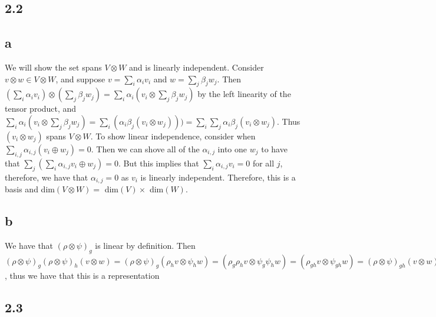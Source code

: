 \documentclass[]{article}
\begin{document}
\subsection*{2.2}
\subsection*{a}
We will show the set spans $V \otimes W$ and is linearly independent.
Consider $v \otimes w \in V \otimes W$, and suppose $v = \sum_i \alpha_i v_i$ and $w = \sum_j \beta_j w_j$. Then $ (\sum_i \alpha_i v_i) \otimes (\sum_j \beta_j w_j) = \sum_i \alpha_i (v_i \otimes \sum_j \beta_j w_j)$ by the left linearity of the tensor product, and $\sum_i \alpha_i (v_i \otimes \sum_j \beta_j w_j) = \sum_i (\alpha_i \beta_j (v_i \otimes w_j))) = \sum_i \sum_j \alpha_i \beta_j (v_i \otimes w_j)$. Thus $(v_i \otimes w_j)$ spans $V \otimes W$. To show linear independence, consider when $\sum_{i, j} \alpha_{i,j} (v_i \oplus w_j) = 0$. Then we can shove all of the $\alpha_{i, j}$ into one $w_j$ to have that $\sum_j ( \sum_i \alpha_{i,j} v_i \oplus w_j) = 0$. But this implies that $\sum_i \alpha_{i,j} v_i = 0$ for all $j$, therefore, we have that $\alpha_{i, j} = 0$ as $v_i$ is linearly independent. Therefore, this is a basis and dim$(V \otimes W) =$ dim$(V) \times$ dim$(W)$.
\subsection*{b}
We have that $(\rho \otimes \psi)_g$ is linear by definition. Then  $(\rho \otimes \psi)_g (\rho \otimes \psi)_h (v \otimes w) = (\rho \otimes \psi)_g (\rho_h v \otimes \psi_h w) = (\rho_g \rho_h v \otimes \psi_g \psi_h w) = (\rho_{gh} v \otimes \psi_{gh} w) = (\rho \otimes \psi)_{gh} (v \otimes w)$, thus we have that this is a representation

\subsection{2.3}
\end{document}
